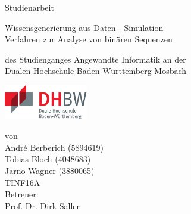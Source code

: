 \def\doctype{Studienarbeit}
\def\title{
Wissensgenerierung aus Daten - Simulation \\
Verfahren zur Analyse von binären Sequenzen
}

\begin{titlepage}

\vspace{10mm}

\begin{center}
	\vspace{5mm}
	
	\huge \doctype
	
	\vspace{14.2pt}
	
	\huge \title
	
	
	
	
	\vspace{32.6pt}
	
	\small des Studienganges Angewandte Informatik an der \\
	\large Dualen Hochschule Baden-Württemberg Mosbach
    
    \vspace{14.2pt}

    \includegraphics[height=1.5cm]{prefix/image/logo-dhbw.eps}

	\vspace{42.6pt}
	
	\small von \\
	\large André Berberich (5894619) \\
	\large Tobias Bloch (4048683) \\
	\large Jarno Wagner (3880065) \\
	TINF16A \\
	
	
	 \vspace{14.2pt}
	\small Betreuer: \\
	\normalsize Prof. Dr. Dirk Saller
	
\end{center}

\vspace{42.6pt}



\vspace{49.7pt}


\end{titlepage}